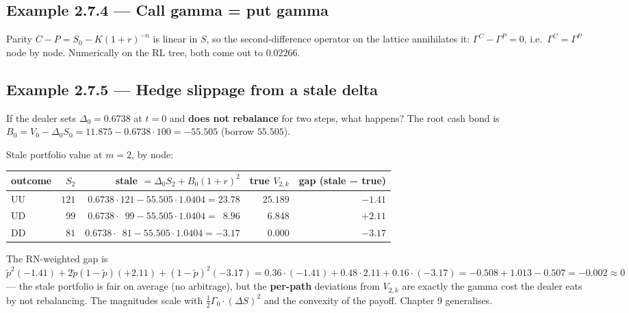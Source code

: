 \documentclass[
  10pt,
  twoside]{book}
\newcounter{none} %
\begin{document}
\subsection{Example 2.7.4 --- Call gamma = put
gamma}\label{example-2.7.4-call-gamma-put-gamma}

Parity \(C-P=S_0-K(1+r)^{-n}\) is linear in \(S\), so the
second-difference operator on the lattice annihilates it:
\(\Gamma^C - \Gamma^P = 0\), i.e.~\(\Gamma^C = \Gamma^P\) node by node.
Numerically on the RL tree, both come out to \(0.02266\).

\subsection{Example 2.7.5 --- Hedge slippage from a stale
delta}\label{example-2.7.5-hedge-slippage-from-a-stale-delta}

If the dealer sets \(\Delta_0=0.6738\) at \(t=0\) and \textbf{does not
rebalance} for two steps, what happens? The root cash bond is
\(B_0 = V_0 - \Delta_0 S_0 = 11.875 - 0.6738\cdot 100 = -55.505\)
(borrow \(55.505\)).

Stale portfolio value at \(m=2\), by node:

{\def\LTcaptype{none} %
\begin{table}[H]
\centering
\begin{tabular}{|l|r|r|r|r|}
\toprule
outcome & \(S_2\) & stale \(=\Delta_0 S_2+B_0(1+r)^2\) & true \(V_{2,k}\) & gap (stale − true) \\
\midrule



UU & \(121\) & \(0.6738\cdot 121-55.505\cdot 1.0404=23.78\) & \(25.189\)
& \(-1.41\) \\
UD & \(\phantom{0}99\) &
\(0.6738\cdot \phantom{0}99-55.505\cdot 1.0404=\phantom{0}8.96\) &
\(\phantom{0}6.848\) & \(+2.11\) \\
DD & \(\phantom{0}81\) &
\(0.6738\cdot \phantom{0}81-55.505\cdot 1.0404=-3.17\) &
\(\phantom{0}0.000\) & \(-3.17\) \\
\bottomrule
\end{tabular}
\end{table}
}

The RN-weighted gap is
\(\tilde p^2(-1.41)+2\tilde p(1-\tilde p)(+2.11)+(1-\tilde p)^2(-3.17) = 0.36\cdot(-1.41)+0.48\cdot 2.11+0.16\cdot(-3.17) = -0.508+1.013-0.507 = -0.002 \approx 0\)
--- the stale portfolio is fair on average (no arbitrage), but the
\textbf{per-path} deviations from \(V_{2,k}\) are exactly the gamma cost
the dealer eats by not rebalancing. The magnitudes scale with
\(\tfrac12\Gamma_0\cdot(\Delta S)^2\) and the convexity of the payoff.
Chapter 9 generalises.
\end{document}
